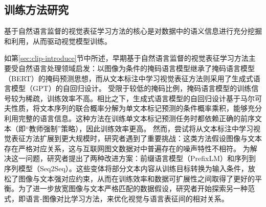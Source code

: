 

\subsection{训练方法研究} %
基于自然语言监督的视觉表征学习方法的核心是对数据中的语义信息进行充分挖掘和利用，从而驱动视觉模型训练。

如第\ref{sec:clip-introduce}节中所述，早期基于自然语言监督的视觉表征学习方法主要受自然语言处理领域启发：以图像为条件的掩码语言模型\cite{sariyildiz2020learning}继承了掩码语言模型\cite{BERT}（BERT）的掩码预测思想，而从文本标注中学习视觉表征方法\cite{desai2021virtex}则采用了生成式语言模型\cite{gpt2}（GPT）的自回归设计。
受限于较低的掩码比例，掩码语言模型的训练信号较为稀疏，训练效率不高。相比之下，生成式语言模型的自回归设计基于马尔可夫性质，将文本序列的联合概率分解为单文本标记预测的条件概率乘积，能够充分利用完整的语言信息。这种方法在训练单文本标记预测任务时都依赖正确的前序文本（即“教师强制”策略），因此训练效率更高。
然而，尝试将从文本标注中学习视觉表征方法扩展到更大规模时，研究者遇到了重要挑战：这类方法假设图像与文本存在严格对应关系，这与互联网图文数据对中普遍存在的噪声特性不相符。
为解决这一问题，研究者提出了两种改进方案：前缀语言模型\cite{SimVLM}（PrefixLM）和序列到序列模型\cite{GIT}（Seq2Seq）。这些变体将部分文本内容从训练目标转换为输入条件，放松了图像与文本强对应约束，从而在训练效率和数据可扩展性之间取得了更好的平衡。为了进一步放宽图像与文本严格匹配的数据假设，研究者开始探索另一种范式，即语言-图像对比学习方法，来优化视觉与语言表征间的相对关系。

